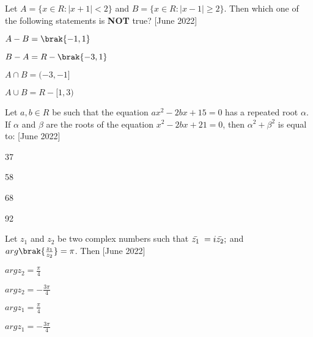 \iffalse
\title{2022}
\author{EE24BTECH11063}
\section{mcq-single}
\fi
\item Let $A=\{x\in R : |x+1| < 2\}$ and $B=\{x\in R : |x-1| \ge 2\}$. Then which one of the following statements is \textbf{NOT} true? \hfill{[June 2022]}
    \begin{enumerate}
    \begin{multicols}{2}
    \item $A-B=\brak{-1,1}$
    \columnbreak
    \item $B-A=R-\brak{-3,1}$
    \end{multicols}
    \begin{multicols}{2}
    \item $A \cap B=(-3,-1]$
    \item $A \cup B=R-[1,3)$
    \end{multicols}
        \end{enumerate}
        \bigskip
        \item Let $a,b \in R$ be such that the equation $ax^2-2bx+15=0$ has a repeated root $\alpha$. If $\alpha$ and $\beta$ are the roots of the equation $x^2-2bx+21=0$, then $\alpha^2+\beta^2$ is equal to: \hfill{[June 2022]}
        \begin{enumerate}
        \begin{multicols}{4}
            \item 37
            \item 58
            \item 68
            \item 92
            \end{multicols}
        \end{enumerate}
        \bigskip
\item Let $z_1$ and $z_2$ be two complex numbers such that  $\Bar{z_1}\;=i\Bar{z_2};$ and $arg\brak{\frac{z_1}{z_2}}=\pi$. Then \hfill{[June 2022]}
        \begin{enumerate}
        \begin{multicols}{2}
        \item $arg z_2=\frac{\pi}{4}$
        \columnbreak
        \item $arg z_2=-\frac{3\pi}{4}$
        \end{multicols}
        \begin{multicols}{2}
        \item $arg z_1=\frac{\pi}{4}$
        \item $arg z_1=-\frac{3\pi}{4}$
        \end{multicols}
        \end{enumerate}
